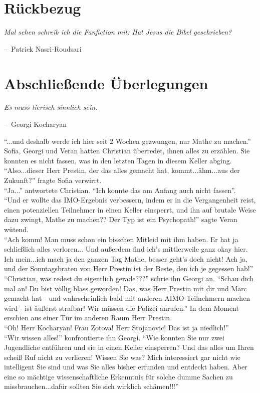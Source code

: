 \documentclass[oneside]{memoir}
\makeatletter
\newenvironment{chapquote}[2][2em]
  {\setlength{\@tempdima}{#1}%
   \def\chapquote@author{#2}%
   \parshape 1 \@tempdima \dimexpr\textwidth-2\@tempdima\relax%
   \itshape}
  {\par\normalfont\hfill--\ \chapquote@author\hspace*{\@tempdima}\par\bigskip}
\makeatother
\begin{document}
\chapter{Rückbezug} %
\begin{chapquote}{Patrick Nasri-Roudsari}
\glqq Mal sehen schreib ich die Fanfiction mit: Hat Jesus die Bibel geschrieben?\grqq
\end{chapquote}

\chapter{Abschließende Überlegungen} %
\begin{chapquote}{Georgi Kocharyan}
\glqq Es muss tierisch sinnlich sein.\grqq
\end{chapquote}
“...und deshalb werde ich hier seit 2 Wochen gezwungen, nur Mathe zu machen.” \\
Sofia, Georgi und Veran hatten Christian überredet, ihnen alles zu erzählen. Sie konnten es nicht fassen, was in den letzten Tagen in diesem Keller abging. \\
“Also...dieser Herr Prestin, der das alles gemacht hat, kommt...ähm...aus der Zukunft?” fragte Sofia verwirrt. \\
“Ja...” antwortete Christian. “Ich konnte das am Anfang auch nicht fassen”. \\
“Und er wollte das IMO-Ergebnis verbessern, indem er in die Vergangenheit reist, einen potenziellen Teilnehmer in einen Keller einsperrt, und ihn auf brutale Weise dazu zwingt, Mathe zu machen?? Der Typ ist ein Psychopath!” sagte Veran wütend. \\
“Ach komm! Man muss schon ein bisschen Mitleid mit ihm haben. Er hat ja schließlich alles verloren...
Und außerdem find ich’s mittlerweile ganz okay hier. Ich mein...ich mach ja den ganzen Tag Mathe, besser geht’s doch nicht!
Ach ja, und der Sonntagsbraten von Herr Prestin ist der Beste, den ich je gegessen hab!” \\
“Christian, was redest du eigentlich gerade???” schrie ihn Georgi an. “Schau dich mal an! Du bist völlig blass geworden! Das, was Herr Prestin mit dir und Marc gemacht hat - und wahrscheinlich bald mit anderen AIMO-Teilnehmern machen wird - ist äußerst strafbar! Wir müssen die Polizei anrufen.”
In dem Moment erschien aus einer Tür im anderen Raum Herr Prestin. \\
“Oh! Herr Kocharyan! Frau Zotova! Herr Stojanovic! Das ist ja niedlich!” \\
“Wir wissen alles!” konfrontierte ihn Georgi. “Wie konnten Sie nur zwei Jugendliche entführen und sie in einen Keller einsperren? Und das alles um Ihren scheiß Ruf nicht zu verlieren! Wissen Sie was? Mich interessiert gar nicht wie intelligent Sie sind und was Sie alles bisher erfunden und entdeckt haben. Aber eine so mächtige wissenschaftliche Erkenntnis für solche dumme Sachen zu missbrauchen...dafür sollten Sie sich wirklich schämen!!!” \\
\end{document}

